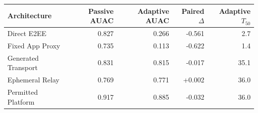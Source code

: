 \begin{tabular}{lrrrr}
\toprule
Architecture & Passive AUAC & Adaptive AUAC & Paired $\Delta$ & Adaptive $T_{50}$ \\
\midrule
Direct E2EE & 0.827 & 0.266 & -0.561 & 2.7 \\
Fixed App Proxy & 0.735 & 0.113 & -0.622 & 1.4 \\
Generated Transport & 0.831 & 0.815 & -0.017 & 35.1 \\
Ephemeral Relay & 0.769 & 0.771 & +0.002 & 36.0 \\
Permitted Platform & 0.917 & 0.885 & -0.032 & 36.0 \\
\bottomrule
\end{tabular}
